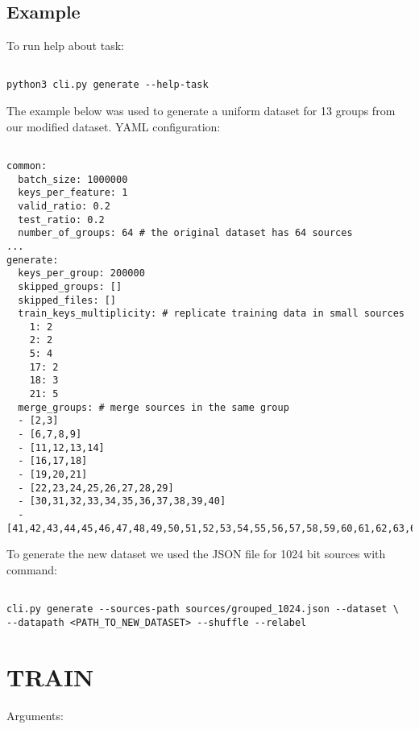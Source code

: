 \subsection*{Example}

To run help about task:

\begin{verbatim}

python3 cli.py generate --help-task

\end{verbatim}

\noindent
The example below was used to generate a uniform dataset for 13 groups from our  modified dataset. YAML configuration:

\begin{verbatim}

common:
  batch_size: 1000000
  keys_per_feature: 1
  valid_ratio: 0.2
  test_ratio: 0.2
  number_of_groups: 64 # the original dataset has 64 sources
...  
generate:
  keys_per_group: 200000
  skipped_groups: []
  skipped_files: []
  train_keys_multiplicity: # replicate training data in small sources
    1: 2
    2: 2
    5: 4
    17: 2
    18: 3
    21: 5
  merge_groups: # merge sources in the same group
  - [2,3]
  - [6,7,8,9]
  - [11,12,13,14]
  - [16,17,18]
  - [19,20,21]
  - [22,23,24,25,26,27,28,29]
  - [30,31,32,33,34,35,36,37,38,39,40]
  - [41,42,43,44,45,46,47,48,49,50,51,52,53,54,55,56,57,58,59,60,61,62,63,64]
\end{verbatim}

\noindent
To generate the new dataset we used the JSON file for 1024 bit sources with command:

\begin{verbatim}

cli.py generate --sources-path sources/grouped_1024.json --dataset \
--datapath <PATH_TO_NEW_DATASET> --shuffle --relabel 

\end{verbatim}

\section{TRAIN}

\noindent
Arguments:

